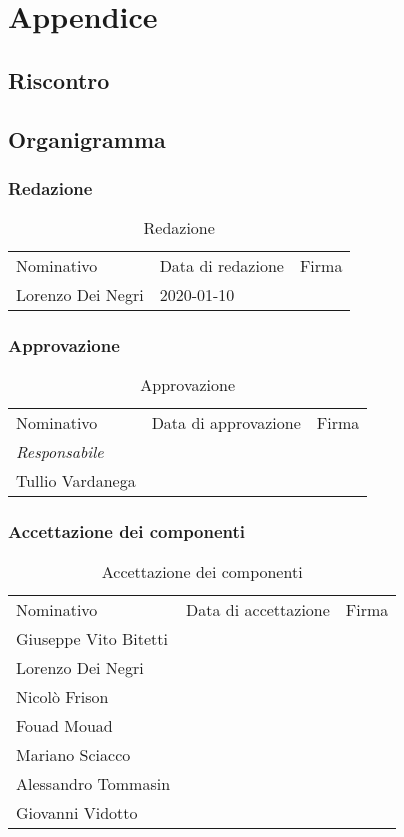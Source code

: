 \section{Appendice}

	\subsection{Riscontro}
	
	\subsection{Organigramma}
		
		\subsubsection{Redazione}
			
			\begin{table}[h!]
				\centering
					\begin{tabular}{lll}
						Nominativo & Data di redazione & Firma \\
						Lorenzo Dei Negri & 2020-01-10 & \\
					\end{tabular}
				\caption{Redazione}
			\end{table}
		
		\subsubsection{Approvazione}
			
			\begin{table}[h!]
				\centering
				\begin{tabular}{lll}
					Nominativo & Data di approvazione & Firma \\
					\textit{Responsabile} & & \\
					Tullio Vardanega & & \\
				\end{tabular}
				\caption{Approvazione}
			\end{table}
			
		\subsubsection{Accettazione dei componenti}
			
			\begin{table}[h!]
				\centering
				\begin{tabular}{lll}
					Nominativo & Data di accettazione & Firma \\
					Giuseppe Vito Bitetti & & \\
					Lorenzo Dei Negri & & \\
					Nicolò Frison & & \\
					Fouad Mouad & & \\
					Mariano Sciacco & & \\
					Alessandro Tommasin & & \\
					Giovanni Vidotto & & \\
				\end{tabular}
				\caption{Accettazione dei componenti}
			\end{table}
			

